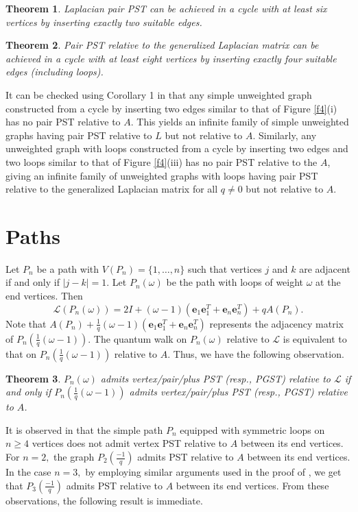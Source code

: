 \documentclass[12pt,a4paper]{article}
\newtheorem{thm}{Theorem}
\def \e {{\mathbf e}}
\newcommand{\ob}[1]{\left(#1\right)}
\begin{document}
\begin{thm}
\label{9}
Laplacian pair PST can be achieved in a cycle with at least six vertices by inserting exactly two suitable edges.
\end{thm}

\begin{thm}
\label{10}
Pair PST relative to the generalized Laplacian matrix can be achieved in a cycle with at least eight vertices by inserting exactly four suitable edges (including loops).
\end{thm}

It can be checked using Corollary 1 in \cite{sarojini3} that any simple unweighted graph constructed from a cycle by inserting two edges similar to that of Figure \ref{f4}(i) has no pair PST relative to $A$. This yields an infinite family of simple unweighted graphs having pair PST relative to $L$ but not relative to $A$. Similarly, any unweighted graph with loops constructed from a cycle by inserting two edges and two loops similar to that of Figure \ref{f4}(iii) has no pair PST relative to the $A$, giving an infinite family of unweighted graphs with loops having pair PST relative to the generalized Laplacian matrix for all $q\neq 0$ but not relative to $A$.


\section{Paths}
\label{sec5}
Let $P_n$ be a path with $V(P_n)=\{1,\ldots,n\}$ such that vertices $j$ and $k$ are adjacent if and only if $|j-k|=1.$ Let $P_n(\omega)$ be the path with loops of weight $\omega$ at the end vertices. Then
$$\mathscr{L}(P_n(\omega))=2I+(\omega -1)(\e_1\e_1^T+\e_n\e_n^T)+qA(P_n).$$
Note that $A(P_n)+\frac{1}{q}(\omega-1)(\e_1\e_1^T+\e_n\e_n^T)$ represents the adjacency matrix of $P_n\ob{\frac{1}{q}(\omega-1)}$. The quantum walk on $P_n(\omega)$ relative to $\mathscr{L}$ is equivalent to that on $P_n\ob{\frac{1}{q}(\omega-1)}$ relative to $A$. Thus, we have the following observation.

\begin{thm}\label{T8}
$P_n(\omega)$ admits vertex/pair/plus PST (resp., PGST) relative to $\mathscr{L}$ if and only if $P_n\ob{\frac{1}{q}(\omega-1)}$ admits vertex/pair/plus PST (resp., PGST) relative to $A$.
\end{thm}
It is observed in \cite[Theorem 3.4 and Theorem 3.8]{kempton} that the simple path $P_n$ equipped with symmetric loops on $n \geq 4$ vertices does not admit vertex PST relative to $A$ between its end vertices. For $n=2,$ the graph $P_2\ob{\frac{-1}{q}}$ admits PST relative to $A$ between its end vertices. In the case $n=3,$ by employing similar arguments used in the proof of \cite[Theorem 3.3]{kempton2}, we get that $P_3\ob{\frac{-1}{q}}$ admits PST relative to $A$ between its end vertices. From these observations, the following result is immediate.
\end{document}
